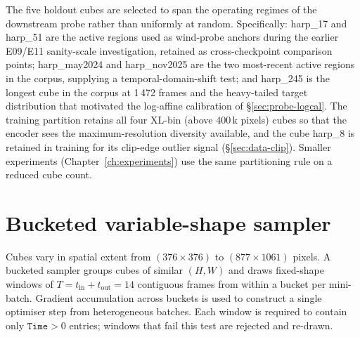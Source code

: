 The five holdout cubes are selected to span the operating regimes
of the downstream probe rather than uniformly at random.
Specifically: harp\_17 and harp\_51 are the active regions used as
wind-probe anchors during the earlier E09/E11 sanity-scale
investigation, retained as cross-checkpoint comparison points;
harp\_may2024 and harp\_nov2025 are the two most-recent active
regions in the corpus, supplying a temporal-domain-shift test;
and harp\_245 is the longest cube in the corpus at 1\,472 frames
and the heavy-tailed target distribution that motivated the
log-affine calibration of \S\ref{sec:probe-logcal}. The training
partition retains all four XL-bin (above $400\,\mathrm{k}$
pixels) cubes so that the encoder sees the maximum-resolution
diversity available, and the cube harp\_8 is retained in training
for its clip-edge outlier signal (\S\ref{sec:data-clip}). Smaller
experiments (Chapter~\ref{ch:experiments}) use the same
partitioning rule on a reduced cube count.

\section{Bucketed variable-shape sampler}
\label{sec:data-sampler}

Cubes vary in spatial extent from $(376\times376)$ to
$(877\times1061)$ pixels. A bucketed sampler groups cubes of
similar $(H,W)$ and draws fixed-shape windows of $T = t_{\text{in}}
+ t_{\text{out}} = 14$ contiguous frames from within a bucket per
mini-batch. Gradient accumulation across buckets is used to
construct a single optimiser step from heterogeneous batches. Each
window is required to contain only $\mathtt{Time}>0$ entries; windows
that fail this test are rejected and re-drawn.


